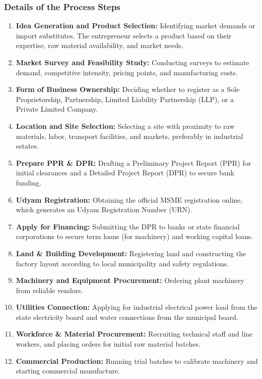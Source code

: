 \documentclass[12pt,a4paper]{article}
\begin{document}
\subsubsection{Details of the Process Steps}
\begin{enumerate}[label=\textbf{\arabic*.}, leftmargin=*, itemsep=3.5pt]
  \item \textbf{Idea Generation and Product Selection:} Identifying market demands or import substitutes. The entrepreneur selects a product based on their expertise, raw material availability, and market needs.
  \item \textbf{Market Survey and Feasibility Study:} Conducting surveys to estimate demand, competitive intensity, pricing points, and manufacturing costs.
  \item \textbf{Form of Business Ownership:} Deciding whether to register as a Sole Proprietorship, Partnership, Limited Liability Partnership (LLP), or a Private Limited Company.
  \item \textbf{Location and Site Selection:} Selecting a site with proximity to raw materials, labor, transport facilities, and markets, preferably in industrial estates.
  \item \textbf{Prepare PPR \& DPR:} Drafting a Preliminary Project Report (PPR) for initial clearances and a Detailed Project Report (DPR) to secure bank funding.
  \item \textbf{Udyam Registration:} Obtaining the official MSME registration online, which generates an Udyam Registration Number (URN).
  \item \textbf{Apply for Financing:} Submitting the DPR to banks or state financial corporations to secure term loans (for machinery) and working capital loans.
  \item \textbf{Land \& Building Development:} Registering land and constructing the factory layout according to local municipality and safety regulations.
  \item \textbf{Machinery and Equipment Procurement:} Ordering plant machinery from reliable vendors.
  \item \textbf{Utilities Connection:} Applying for industrial electrical power load from the state electricity board and water connections from the municipal board.
  \item \textbf{Workforce \& Material Procurement:} Recruiting technical staff and line workers, and placing orders for initial raw material batches.
  \item \textbf{Commercial Production:} Running trial batches to calibrate machinery and starting commercial manufacture.
\end{enumerate}
\end{document}
